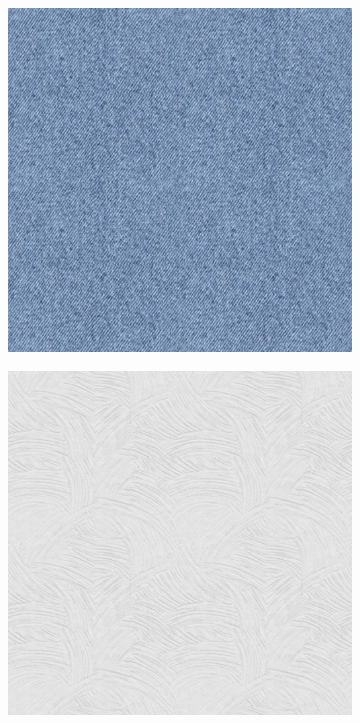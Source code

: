 \begin{figure}[h]
    \begin{subfigure}[b]{0.32\textwidth}
        \centering
        \includegraphics[width=\textwidth]{img/ch6/extrapolation_jeans.png}
    \end{subfigure}
    \begin{subfigure}[b]{0.32\textwidth}
        \centering
        \includegraphics[width=\textwidth]{img/ch6/extrapolation_wall.png}

\end{subfigure}
\end{figure}
